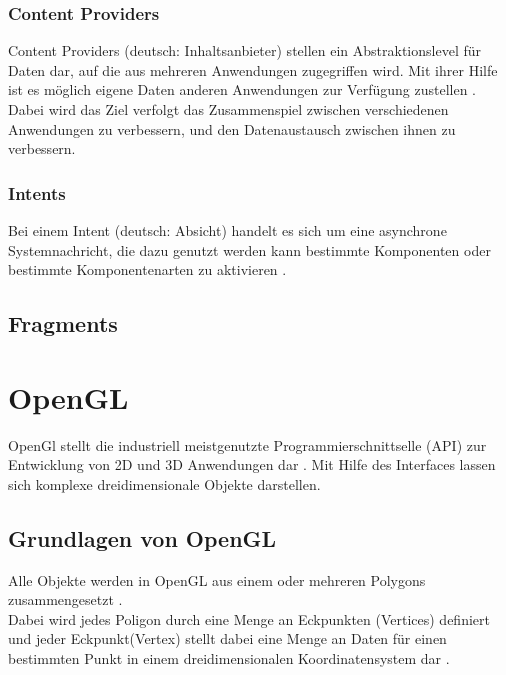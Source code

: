 \subsubsection{Content Providers}
Content Providers (deutsch: \glqq Inhaltsanbieter\grqq ) stellen ein Abstraktionslevel für Daten dar, auf die aus mehreren Anwendungen zugegriffen wird\citep{murphy:beginning-android}. Mit ihrer Hilfe ist es möglich eigene Daten anderen Anwendungen zur Verfügung zustellen \citep{murphy:beginning-android}. \\
Dabei wird das Ziel verfolgt das Zusammenspiel zwischen verschiedenen Anwendungen zu verbessern, und den Datenaustausch zwischen ihnen zu verbessern.

\subsubsection{Intents}
Bei einem Intent (deutsch: \glqq Absicht\grqq ) handelt es sich um eine asynchrone Systemnachricht, die dazu genutzt werden kann bestimmte Komponenten oder bestimmte Komponentenarten zu aktivieren \citep{android:fundamentals}.

\subsection{Fragments}

\section{OpenGL}\label{OpenGL}
OpenGl stellt die industriell meistgenutzte Programmierschnittselle (API) zur Entwicklung von 2D und 3D Anwendungen dar \citep{khronos:opengl-overview}. Mit Hilfe des Interfaces lassen sich komplexe dreidimensionale Objekte darstellen.

\subsection{Grundlagen von OpenGL}
Alle Objekte werden in OpenGL aus einem oder mehreren Polygons zusammengesetzt \citep[S. 5]{shreiner:opengl}.\\
Dabei wird jedes Poligon durch eine Menge an Eckpunkten (Vertices) definiert und jeder Eckpunkt(Vertex) stellt dabei eine Menge an Daten für einen bestimmten Punkt in einem dreidimensionalen Koordinatensystem dar \citep{vries:learn-opengl-triangle}. 

